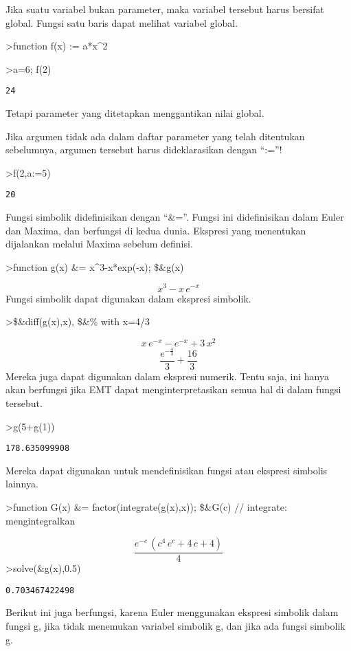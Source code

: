 \documentclass[
]{book}
\begin{document}
Jika suatu variabel bukan parameter, maka variabel tersebut harus bersifat global. Fungsi satu baris dapat melihat variabel global.

\textgreater function f(x) := a*x\^{}2

\textgreater a=6; f(2)

\begin{verbatim}
24
\end{verbatim}

Tetapi parameter yang ditetapkan menggantikan nilai global.

Jika argumen tidak ada dalam daftar parameter yang telah ditentukan sebelumnya, argumen tersebut harus dideklarasikan dengan ``:=''!

\textgreater f(2,a:=5)

\begin{verbatim}
20
\end{verbatim}

Fungsi simbolik didefinisikan dengan ``\&=''. Fungsi ini didefinisikan dalam Euler dan Maxima, dan berfungsi di kedua dunia. Ekspresi yang menentukan dijalankan melalui Maxima sebelum definisi.

\textgreater function g(x) \&= x\^{}3-x*exp(-x); \$\&g(x)

\[x^3-x\,e^ {- x }\]Fungsi simbolik dapat digunakan dalam ekspresi simbolik.

\textgreater\$\&diff(g(x),x), \$\&\% with x=4/3

\[x\,e^ {- x }-e^ {- x }+3\,x^2\] \[\frac{e^ {- \frac{4}{3} }}{3}+\frac{16}{3}\]Mereka juga dapat digunakan dalam ekspresi numerik. Tentu saja, ini hanya akan berfungsi jika EMT dapat menginterpretasikan semua hal di dalam fungsi tersebut.

\textgreater g(5+g(1))

\begin{verbatim}
178.635099908
\end{verbatim}

Mereka dapat digunakan untuk mendefinisikan fungsi atau ekspresi simbolis lainnya.

\textgreater function G(x) \&= factor(integrate(g(x),x)); \$\&G(c) // integrate: mengintegralkan

\[\frac{e^ {- c }\,\left(c^4\,e^{c}+4\,c+4\right)}{4}\]\textgreater solve(\&g(x),0.5)

\begin{verbatim}
0.703467422498
\end{verbatim}

Berikut ini juga berfungsi, karena Euler menggunakan ekspresi simbolik dalam fungsi g, jika tidak menemukan variabel simbolik g, dan jika ada fungsi simbolik g.
\end{document}
